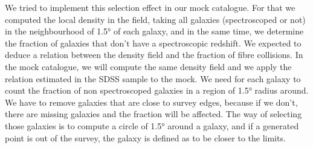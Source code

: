 We tried to implement this selection effect in our mock catalogue. For that
we computed the local density in the field, taking all galaxies
(spectroscoped or not) in the neighbourhood of 1.5° of each galaxy, and in
the same time, we determine the fraction of galaxies that don't have a
spectroscopic redshift. We expected to deduce a relation between the density
field and the fraction of fibre collisions. In the mock catalogue, we will
compute the same density field and we apply the relation estimated in the
SDSS sample to the mock. We need for each galaxy to count the fraction of
non spectroscoped galaxies in a region of 1.5° radius around. We have to
remove galaxies that are close to survey edges, because if we don't, there
are missing galaxies and the fraction will be affected. The way of selecting
those galaxies is to compute a circle of 1.5° around a galaxy, and if a
generated point is out of the survey, the galaxy is defined as to be closer
to the limits.

